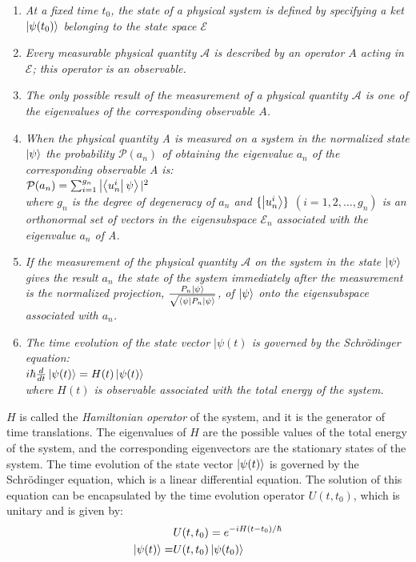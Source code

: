 \documentclass[
  journal=largetwo,
  year=2023,
]{cup-journal}
\begin{document}
\begin{enumerate}[itemsep=5px]
  \item \emph{At a fixed time \(t_0\), the state of a physical system is defined by specifying a ket \(\ket{\psi(t_0)}\) belonging to the state space \(\mathcal{E}\)}

  \item \emph{Every measurable physical quantity \(\mathcal{A}\) is described by an operator \(A\) acting in \(\mathcal{E}\); this operator is an observable.}

  \item \emph{The only possible result of the measurement of a physical quantity \(\mathcal{A}\) is one of the eigenvalues of the corresponding observable \(A\).}

  \item \emph{When the physical quantity A is measured on a system in the normalized state \(\ket{\psi}\) the probability \(\mathcal{P}(a_n)\)  of obtaining the eigenvalue \(a_n\) of the corresponding observable A is: \\
          \( \mathcal{P}(a_n) = \sum_{i=1}^{g_n}\ket{\bra{u_n^i}\psi}|^2 \) \\
          where \(g_n\) is the degree of degeneracy of \(a_n\) and \( \{ \ket{u_n^i} \} \) \( (i=1,2,\ldots, g_n) \) is an orthonormal set of vectors in the eigensubspace \(\mathcal{E}_n\) associated with the eigenvalue \(a_n\) of A.}

  \item \emph{If the measurement of the physical quantity \(\mathcal{A}\) on the system in the state \(\ket{\psi }\) gives the result \(a_n\) the state of the system immediately after the measurement is the normalized projection, \(\frac{P_n\ket{\psi }}{\sqrt{\bra{\psi }P_n\ket{\psi }} }\), of \(\ket{\psi }\) onto the eigensubspace associated with \(a_n\).}

  \item \emph{The time evolution of the state vector \(|\psi (t)\) is governed by the Schrödinger equation: \\
          \(i\hbar \frac{d}{dt}\ket{\psi(t)} = H(t)\ket{\psi(t)}\) \\
          where \(H(t)\) is observable associated with the total energy of the system.}\label{post:schroedinger}
\end{enumerate}

\noindent \(H\) is called the {\it Hamiltonian operator} of the system, and it is the generator of time translations. The eigenvalues of \(H\) are the possible values of the total energy of the system, and the corresponding eigenvectors are the stationary states of the system.
The time evolution of the state vector \(\ket{\psi(t)}\) is governed by the Schrödinger equation, which is a linear differential equation. The solution of this equation can be encapsulated by the time evolution operator \(U(t,t_0)\), which is unitary and is given by:
\begin{align}
                   & U(t,t_0)       = e^{-iH(t-t_0)/\hbar} \\
  \ket{\psi(t)}  = & U(t,t_0)\ket{\psi(t_0)}
\end{align}
\end{document}
